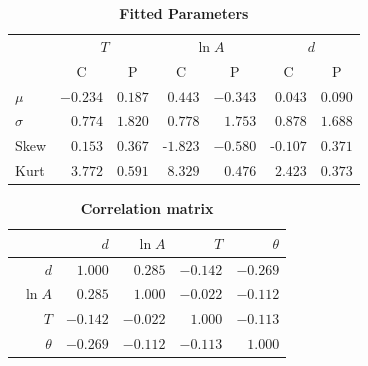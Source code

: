 \documentclass[11pt, letterpaper]{article}
\begin{document}
\begin{table}
  \begin{center}
    \begin{tabular}{lrrrrrr}\toprule
      {} & \multicolumn{2}{c}{$T$} & \multicolumn{2}{c}{$\ln A$} & \multicolumn{2}{c}{$d$} \\
      {}         & \multicolumn{1}{c}{C}         & \multicolumn{1}{c}{P}           & \multicolumn{1}{c}{C}         & \multicolumn{1}{c}{P}               & \multicolumn{1}{c}{C}         & \multicolumn{1}{c}{P}           \\\midrule
      $\mu$      & $-0.234$  & $0.187$  &  $0.443$  & $-0.343$  &  $0.043$  & $0.090$    \\
      $\sigma$   & $ 0.774$  & $1.820$  &  $0.778$  & $ 1.753$  &  $0.878$  & $1.688$    \\
      Skew & $ 0.153$  & $0.367$  & -$1.823$  & $-0.580$  & -$0.107$  & $0.371$    \\
      Kurt & $ 3.772$  & $0.591$  &  $8.329$  & $ 0.476$  &  $2.423$  & $0.373$    \\
      \bottomrule
    \end{tabular}
  \end{center}
  \caption{{\bfseries Fitted Parameters}}
  \label{tab:fit_distributions}
\end{table}


\begin{table}
  \begin{center}
    \begin{tabular}{rrrrr}
      \toprule
      {}       & $d$    & $\ln A$ & $T$    & $\theta$ \\\midrule
      $d$      & $1.000 $ & $0.285 $  & $-0.142$ & $-0.269$\\\
      $\ln A$  & $0.285 $ & $1.000 $  & $-0.022$ & $-0.112$\\
      $T$      & $-0.142$ & $-0.022$  & $1.000 $ & $-0.113$\\
      $\theta$ & $-0.269$ & $-0.112$  & $-0.113$ & $1.000 $\\
      \bottomrule
    \end{tabular}
  \end{center}
  \caption{{\bfseries Correlation matrix}}
  \label{tab:corr}
\end{table}
\end{document}
